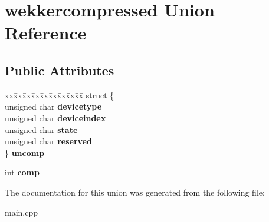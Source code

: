 \hypertarget{unionwekkercompressed}{}\section{wekkercompressed Union Reference}
\label{unionwekkercompressed}
\subsection*{Public Attributes}
\begin{DoxyCompactItemize}
\item 
\hypertarget{unionwekkercompressed_a57196309507ce01dd912115cac0a5758}{}\begin{tabbing}
xx\=xx\=xx\=xx\=xx\=xx\=xx\=xx\=xx\=\kill
struct \{\\
\>unsigned char {\bfseries devicetype}\\
\>unsigned char {\bfseries deviceindex}\\
\>unsigned char {\bfseries state}\\
\>unsigned char {\bfseries reserved}\\
\} {\bfseries uncomp}\label{unionwekkercompressed_a57196309507ce01dd912115cac0a5758}
\\

\end{tabbing}\item 
\hypertarget{unionwekkercompressed_ab8f84a970e540eb193ebecd0a47d31d2}{}int {\bfseries comp}\label{unionwekkercompressed_ab8f84a970e540eb193ebecd0a47d31d2}

\end{DoxyCompactItemize}


The documentation for this union was generated from the following file\+:\begin{DoxyCompactItemize}
\item 
main.\+cpp\end{DoxyCompactItemize}
